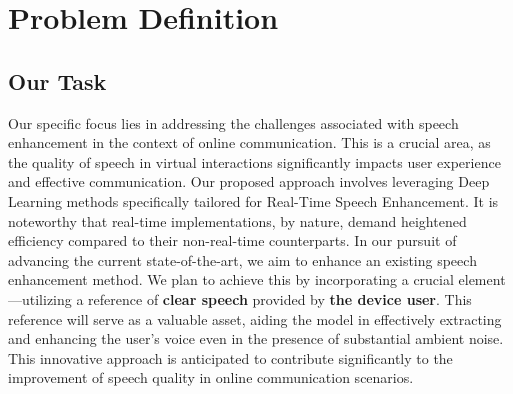 
% 
% 



\chapter{Problem Definition}
\label{chap:problem-def}

\begingroup
\let\clearpage\relax






\section{Our Task}
Our specific focus lies in addressing the challenges associated with speech enhancement in the context of online communication. This is a crucial area, as the quality of speech in virtual interactions significantly impacts user experience and effective communication.
Our proposed approach involves leveraging Deep Learning methods specifically tailored for Real-Time Speech Enhancement. It is noteworthy that real-time implementations, by nature, demand heightened efficiency compared to their non-real-time counterparts.
In our pursuit of advancing the current state-of-the-art, we aim to enhance an existing speech enhancement method. We plan to achieve this by incorporating a crucial element—utilizing a reference of \textbf{clear speech} provided by \textbf{the device user}. This reference will serve as a valuable asset, aiding the model in effectively extracting and enhancing the user's voice even in the presence of substantial ambient noise. This innovative approach is anticipated to contribute significantly to the improvement of speech quality in online communication scenarios.

\endgroup